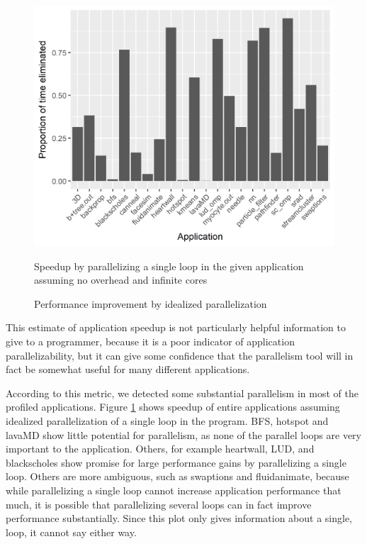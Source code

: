 \documentclass[12pt,twoside]{reedthesis}
\begin{document}
		\begin{figure}
			\caption{Performance improvement by idealized parallelization}%
			\label{fig:application-parr}
			
			\begin{minipage}{0.73\textwidth} %
				\includegraphics[scale=0.9]{plots/application_idealized_speedup.png}
				{\footnotesize Speedup by parallelizing a single loop in the given application assuming no overhead and infinite cores\par}
			\end{minipage}
		\end{figure}
		This estimate of application speedup is not particularly helpful information to give to a programmer, because it is a poor indicator of application parallelizability, but it can give some confidence that the parallelism tool will in fact be somewhat useful for many different applications. 
				
		According to this metric, we detected some substantial parallelism in most of the profiled applications. 
		Figure \ref{fig:application-parr} shows speedup of entire applications assuming idealized parallelization of a single loop in the program. BFS, hotspot and lavaMD show little potential for parallelism, as none of the parallel loops are very important to the application. Others, for example heartwall, LUD, and blackscholes show promise for large performance gains by parallelizing a single loop. Others are more ambiguous, such as swaptions and fluidanimate, because while parallelizing a single loop cannot increase application performance that much, it is possible that parallelizing several loops can in fact improve performance substantially. Since this plot only gives information about a single, loop, it cannot say either way.
		
\end{document}
